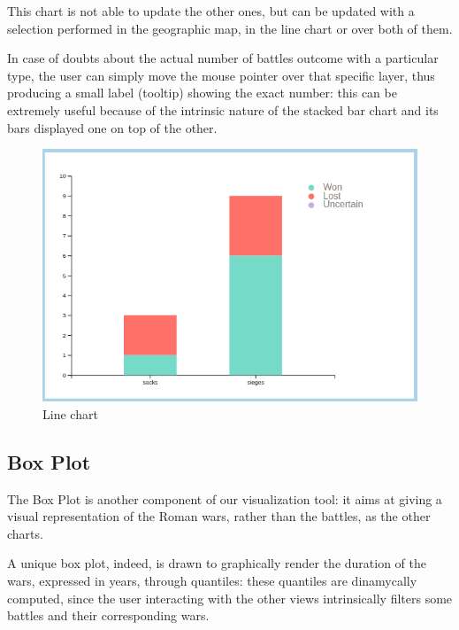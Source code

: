 This chart is not able to update the other ones, but can be updated with a selection performed in the geographic map, in the line chart or over both of them.

In case of doubts about the actual number of battles outcome with a particular type, the user can simply move the mouse pointer over that specific layer, thus producing a small label (tooltip) showing the exact number: this can be extremely useful because of the intrinsic nature of the stacked bar chart and its bars displayed one on top of the other.
\begin{figure}[h]
\centering
\includegraphics[scale=0.30]{./images/stacked_bar_chart.png}
\caption{Line chart}
\end{figure}

\subsection{Box Plot}
The Box Plot is another component of our visualization tool: it aims at giving a visual representation of the Roman wars, rather than the battles, as the other charts.

A unique box plot, indeed, is drawn to graphically render the duration of the wars, expressed in years, through quantiles: these quantiles are dinamycally computed, since the user interacting with the other views intrinsically filters some battles and their corresponding wars.

